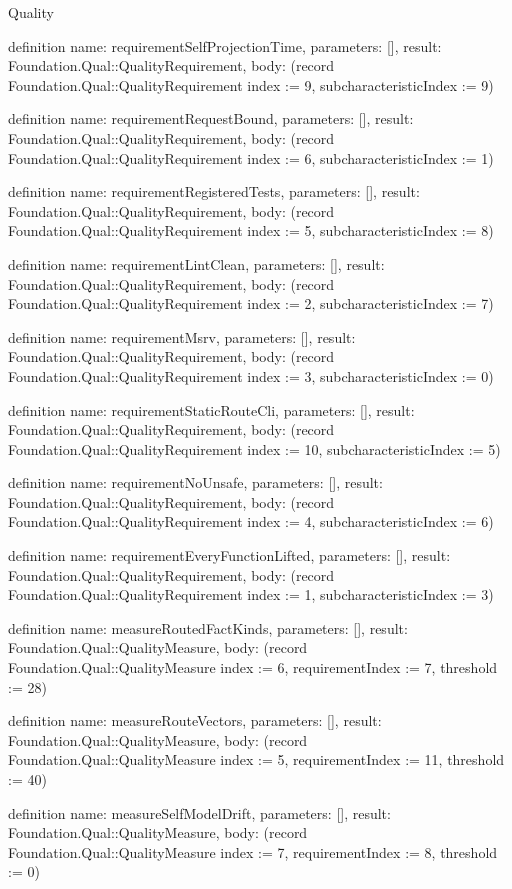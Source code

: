 \begin{lexlean}{Quality}
\begin{semanticmodule}
definition{
  name: requirementSelfProjectionTime,
  parameters: [],
  result: Foundation.Qual::QualityRequirement,
  body: (record Foundation.Qual::QualityRequirement {index := 9, subcharacteristicIndex := 9})
}

definition{
  name: requirementRequestBound,
  parameters: [],
  result: Foundation.Qual::QualityRequirement,
  body: (record Foundation.Qual::QualityRequirement {index := 6, subcharacteristicIndex := 1})
}

definition{
  name: requirementRegisteredTests,
  parameters: [],
  result: Foundation.Qual::QualityRequirement,
  body: (record Foundation.Qual::QualityRequirement {index := 5, subcharacteristicIndex := 8})
}

definition{
  name: requirementLintClean,
  parameters: [],
  result: Foundation.Qual::QualityRequirement,
  body: (record Foundation.Qual::QualityRequirement {index := 2, subcharacteristicIndex := 7})
}

definition{
  name: requirementMsrv,
  parameters: [],
  result: Foundation.Qual::QualityRequirement,
  body: (record Foundation.Qual::QualityRequirement {index := 3, subcharacteristicIndex := 0})
}

definition{
  name: requirementStaticRouteCli,
  parameters: [],
  result: Foundation.Qual::QualityRequirement,
  body: (record Foundation.Qual::QualityRequirement {index := 10, subcharacteristicIndex := 5})
}

definition{
  name: requirementNoUnsafe,
  parameters: [],
  result: Foundation.Qual::QualityRequirement,
  body: (record Foundation.Qual::QualityRequirement {index := 4, subcharacteristicIndex := 6})
}

definition{
  name: requirementEveryFunctionLifted,
  parameters: [],
  result: Foundation.Qual::QualityRequirement,
  body: (record Foundation.Qual::QualityRequirement {index := 1, subcharacteristicIndex := 3})
}

definition{
  name: measureRoutedFactKinds,
  parameters: [],
  result: Foundation.Qual::QualityMeasure,
  body: (record Foundation.Qual::QualityMeasure {index := 6, requirementIndex := 7, threshold := 28})
}

definition{
  name: measureRouteVectors,
  parameters: [],
  result: Foundation.Qual::QualityMeasure,
  body: (record Foundation.Qual::QualityMeasure {index := 5, requirementIndex := 11, threshold := 40})
}

definition{
  name: measureSelfModelDrift,
  parameters: [],
  result: Foundation.Qual::QualityMeasure,
  body: (record Foundation.Qual::QualityMeasure {index := 7, requirementIndex := 8, threshold := 0})
}


\end{semanticmodule}
\end{lexlean}

